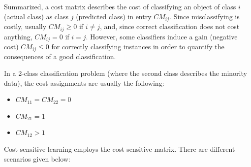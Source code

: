 Summarized, a cost matrix describes the cost of classifying an object of class $i$ (actual class) as class $j$ (predicted class) in entry $CM_{ij}$. Since misclassifying is costly, usually $CM_{ij} \geq 0$ if $i \neq j$, and, since correct classification does not cost anything, $CM_{ij}  = 0$ if \(i = j\). However, some classifiers induce a gain (negative cost) $CM_{ij} \leq 0$ for correctly classifying instances in order to quantify the consequences of a good classification.

In a 2-class classification problem (where the second class describes the minority data), the cost assignments are usually the following:
\begin{itemize}
\item $CM_{11} = CM_{22} = 0$
\item $CM_{21} = 1$
\item $CM_{12} > 1$
\end{itemize}

Cost-sensitive learning employs the cost-sensitive matrix. There are different scenarios given below:

